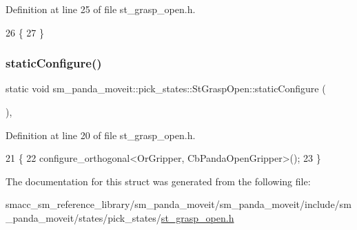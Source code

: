 Definition at line 25 of file st\+\_\+grasp\+\_\+open.\+h.


\begin{DoxyCode}
26     \{
27     \}
\end{DoxyCode}
\mbox{\label{structsm__panda__moveit_1_1pick__states_1_1StGraspOpen_a8cec2ad20840c68f599671143e0ffbdc}} 
\subsubsection{\texorpdfstring{static\+Configure()}{staticConfigure()}}
{\footnotesize\ttfamily static void sm\+\_\+panda\+\_\+moveit\+::pick\+\_\+states\+::\+St\+Grasp\+Open\+::static\+Configure (\begin{DoxyParamCaption}{ }\end{DoxyParamCaption})\hspace{0.3cm}{\ttfamily [inline]}, {\ttfamily [static]}}



Definition at line 20 of file st\+\_\+grasp\+\_\+open.\+h.


\begin{DoxyCode}
21     \{
22         configure\_orthogonal<OrGripper, CbPandaOpenGripper>();
23     \}
\end{DoxyCode}


The documentation for this struct was generated from the following file\+:\begin{DoxyCompactItemize}
\item 
smacc\+\_\+sm\+\_\+reference\+\_\+library/sm\+\_\+panda\+\_\+moveit/sm\+\_\+panda\+\_\+moveit/include/sm\+\_\+panda\+\_\+moveit/states/pick\+\_\+states/\hyperlink{st__grasp__open_8h}{st\+\_\+grasp\+\_\+open.\+h}\end{DoxyCompactItemize}
